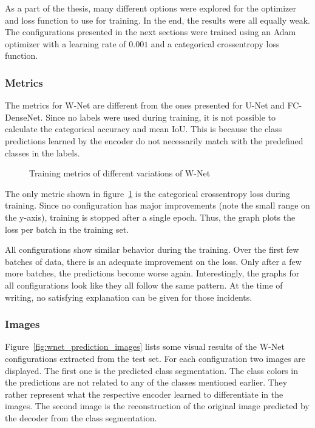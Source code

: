 As a part of the thesis, many different options were explored for the optimizer and loss function to use for training. In the end, the results were all equally weak. The configurations presented in the next sections were trained using an Adam optimizer with a learning rate of $0.001$ and a categorical crossentropy loss function.

\subsubsection{Metrics}
The metrics for W-Net are different from the ones presented for U-Net and FC-DenseNet. Since no labels were used during training, it is not possible to calculate the categorical accuracy and mean IoU. This is because the class predictions learned by the encoder do not necessarily match with the predefined classes in the labels.

\begin{figure}
    \centering
            
    \caption{Training metrics of different variations of W-Net}
    \label{fig:wnet_train_metrics}
\end{figure}

The only metric shown in figure~\ref{fig:wnet_train_metrics} is the categorical crossentropy loss during training. Since no configuration has major improvements (note the small range on the y-axis), training is stopped after a single epoch. Thus, the graph plots the loss per batch in the training set.

All configurations show similar behavior during the training. Over the first few batches of data, there is an adequate improvement on the loss. Only after a few more batches, the predictions become worse again. Interestingly, the graphs for all configurations look like they all follow the same pattern. At the time of writing, no satisfying explanation can be given for those incidents.

\subsubsection{Images}
Figure~\ref{fig:wnet_prediction_images} lists some visual results of the W-Net configurations extracted from the test set. For each configuration two images are displayed. The first one is the predicted class segmentation. The class colors in the predictions are not related to any of the classes mentioned earlier. They rather represent what the respective encoder learned to differentiate in the images. The second image is the reconstruction of the original image predicted by the decoder from the class segmentation.

